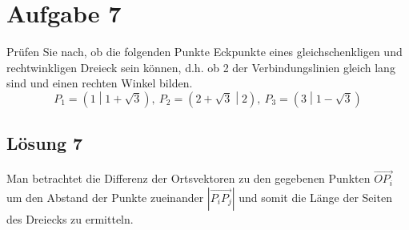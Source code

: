 \section*{Aufgabe 7}

Prüfen Sie nach, ob die folgenden Punkte Eckpunkte eines gleichschenkligen und rechtwinkligen Dreieck sein können, d.h. ob 2 der Verbindungslinien gleich lang sind und einen rechten Winkel bilden.
\begin{equation*}
  P_{1} =\left( 1\middle| 1+\sqrt{3}\right) ,\ P_{2} =\left( 2+\sqrt{3}\middle| 2\right) ,\ P_{3} =\left( 3\middle| 1-\sqrt{3}\right)
\end{equation*}


\subsection*{Lösung 7}

Man betrachtet die Differenz der Ortsvektoren zu den gegebenen Punkten $\displaystyle \overrightarrow{OP_{i}}$ um den Abstand der Punkte zueinander $\displaystyle \left| \overrightarrow{P_{i} P_{j}}\right| $ und somit die Länge der Seiten des Dreiecks zu ermitteln.



